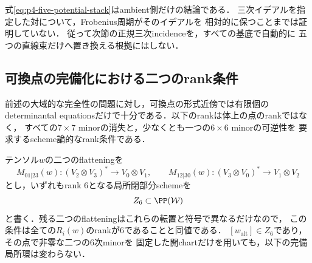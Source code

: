式\eqref{eq:p4-five-potential-stack}はambient側だけの結論である．
三次イデアルを指定した対について，Frobenius周期がそのイデアルを
相対的に保つことまでは証明していない．
従って次節の正規三次incidenceを，すべての基底で自動的に
五つの直線束だけへ置き換える根拠にはしない．

\subsection{可換点の完備化における二つのrank条件}
\label{subsec:p3-formal-rank}

前述の大域的な完全性の問題に対し，可換点の形式近傍では有限個の
determinantal equationsだけで十分である．以下のrankは体上の点のrankではなく，
すべての$7\times7$ minorの消失と，少なくとも一つの$6\times6$ minorの可逆性を
要求するscheme論的なrank条件である．

テンソル$w$の二つのflatteningを
\[
 M_{01|23}(w):(V_2\otimes V_3)^*\longrightarrow V_0\otimes V_1,
 \qquad
 M_{12|30}(w):(V_3\otimes V_0)^*\longrightarrow V_1\otimes V_2
\]
とし，いずれもrank $6$となる局所閉部分schemeを
\[
 Z_6\subset\PP(\mathcal W)
\]
と書く．残る二つのflatteningはこれらの転置と符号で異なるだけなので，
この条件は全ての$R_i(w)$のrankが$6$であることと同値である．
$[w_{\mathrm{alt}}]\in Z_6$であり，その点で非零な二つの$6$次minorを
固定した開chartだけを用いても，以下の完備局所環は変わらない．

